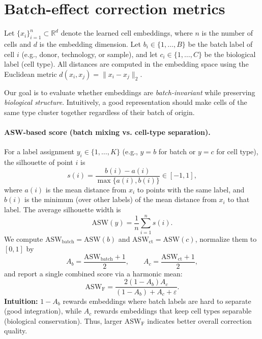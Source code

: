 
\section{Batch-effect correction metrics}
\label{sec:batch_effect_metrics}

Let $\{x_i\}_{i=1}^n \subset \mathbb{R}^d$ denote the learned cell embeddings, where $n$ is the number of cells and $d$ is the embedding dimension.
Let $b_i \in \{1,\dots,B\}$ be the batch label of cell $i$ (e.g., donor, technology, or sample), and let $c_i \in \{1,\dots,C\}$ be the biological label (cell type).
All distances are computed in the embedding space using the Euclidean metric $d(x_i,x_j)=\lVert x_i-x_j \rVert_2$.

Our goal is to evaluate whether embeddings are \emph{batch-invariant} while preserving \emph{biological structure}. Intuitively, a good representation should make cells of the same type cluster together regardless of their batch of origin.

\paragraph{ASW-based score (batch mixing vs. cell-type separation).}
For a label assignment $y_i\in\{1,\dots,K\}$ (e.g., $y=b$ for batch or $y=c$ for cell type), the silhouette of point $i$ is
\begin{equation}
  s(i) = \frac{b(i)-a(i)}{\max\{a(i),b(i)\}}\in[-1,1],
\end{equation}
where $a(i)$ is the mean distance from $x_i$ to points with the same label, and $b(i)$ is the minimum (over other labels) of the mean distance from $x_i$ to that label.
The average silhouette width is
\begin{equation}
  \mathrm{ASW}(y) = \frac{1}{n}\sum_{i=1}^n s(i).
\end{equation}
We compute $\mathrm{ASW}_{\mathrm{batch}}=\mathrm{ASW}(b)$ and $\mathrm{ASW}_{\mathrm{ct}}=\mathrm{ASW}(c)$, normalize them to $[0,1]$ by
\begin{equation}
  A_b = \frac{\mathrm{ASW}_{\mathrm{batch}}+1}{2},\qquad A_c = \frac{\mathrm{ASW}_{\mathrm{ct}}+1}{2},
\end{equation}
and report a single combined score via a harmonic mean:
\begin{equation}
  \mathrm{ASW}_{\mathrm{F}} = \frac{2(1-A_b)A_c}{(1-A_b)+A_c+\varepsilon}.
\end{equation}
\textbf{Intuition:} $1-A_b$ rewards embeddings where batch labels are hard to separate (good integration), while $A_c$ rewards embeddings that keep cell types separable (biological conservation). Thus, larger $\mathrm{ASW}_{\mathrm{F}}$ indicates better overall correction quality.

